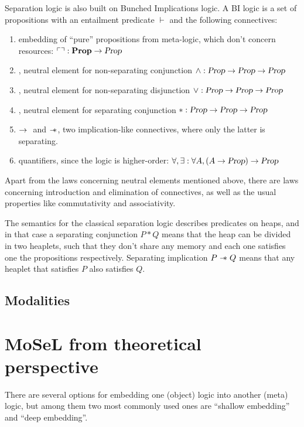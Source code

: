 Separation logic is also built on Bunched Implications logic.
A BI logic is a set of propositions \Prop with an entailment predicate \(\vdash\) and the following connectives:
\begin{enumerate}
\item embedding of ``pure'' propositions from meta-logic, which don't concern resources: \(\ulcorner   \urcorner : \textbf{Prop} \to \textsl{Prop}\)
\item \True, neutral element for non-separating conjunction \(\wedge : \textsl{Prop} \to \textsl{Prop} \to \textsl{Prop}\)
\item \False, neutral element for non-separating disjunction \(\vee : \textsl{Prop} \to \textsl{Prop} \to \textsl{Prop}\)
\item \emp, neutral element for separating conjunction \(* : \textsl{Prop} \to \textsl{Prop} \to \textsl{Prop}\)
\item \(\mathbin{\rightarrow}~\) and \(\mathrel{-\mkern-6mu*}\), two implication-like connectives, where only the latter is separating.
\item quantifiers, since the logic is higher-order: \(\forall, \exists : \forall A, (A \to \textsl{Prop}) \to \textsl{Prop}\)
\end{enumerate}

Apart from the laws concerning neutral elements mentioned above, there are laws concerning introduction and elimination of connectives, as well as the usual properties like commutativity and associativity.

The semantics for the classical separation logic \cite{reynoldsSeparationLogicLogic2002, ohearnLocalReasoningPrograms2001} describes predicates on heaps, and in that case a separating conjunction \(P * Q\) means that the heap can be divided in two heaplets, such that they don't share any memory and each one satisfies one the propositions respectively.
Separating implication \(P \mathrel{-\mkern-6mu*} Q\) means that any heaplet that satisfies \(P\) also satisfies \(Q\).




\subsection{Modalities}
\label{sec:modalities-intro}

\section{MoSeL from theoretical perspective}
\label{sec:ipm_theory}
There are several options for embedding one (object) logic into another (meta) logic, but among them two most commonly used ones are ``shallow embedding'' and ``deep embedding''.


